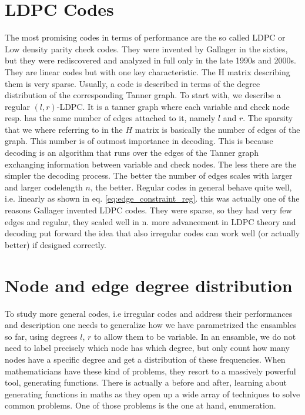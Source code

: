 \section{LDPC Codes}
The most promising codes in terms of performance are the so called LDPC or Low density parity check codes. They were invented by Gallager in the sixties, but they were rediscovered and analyzed in full only in the late 1990s and 2000s. They are linear codes but with one key characteristic. The H matrix describing them is very sparse. Usually, a code is described in terms of the degree distribution of the corresponding Tanner graph. To start with, we describe a regular $(l,r)$-LDPC. It is a tanner graph where each variable and check node resp. has the same number of edges attached to it, namely $l$ and $r$. The sparsity that we where referring to in the $H$ matrix is basically the number of edges of the graph. This number is of outmost importance in decoding. This is because decoding is an algorithm that runs over the edges of the Tanner graph exchanging information between variable and check nodes. The less there are the simpler the decoding process. The better the number of edges scales with larger and larger codelength $n$, the better. Regular codes in general behave quite well, i.e. linearly as shown in eq. \ref{eq:edge_constraint_reg}. this was actually one of the reasons Gallager invented LDPC codes. They were sparse, so they had very few edges and regular, they scaled well in n. more advancement in LDPC theory and decoding put forward the idea that also irregular codes can work well (or actually better) if designed correctly.

\section{Node and edge degree distribution}
To study more general codes, i.e irregular codes and address their performances and description one needs to generalize how we have parametrized the ensambles so far, using degrees $l$, $r$ to allow them to be variable. In an ensamble, we do not need to label precisely which node has which degree, but only count how many nodes have a specific degree and get a distribution of these frequencies. When mathematicians have these kind of problems, they resort to a massively powerful tool, generating functions. There is actually a before and after, learning about generating functions in maths as they open up a wide array of techniques to solve common problems. One of those problems is the one at hand, enumeration.

